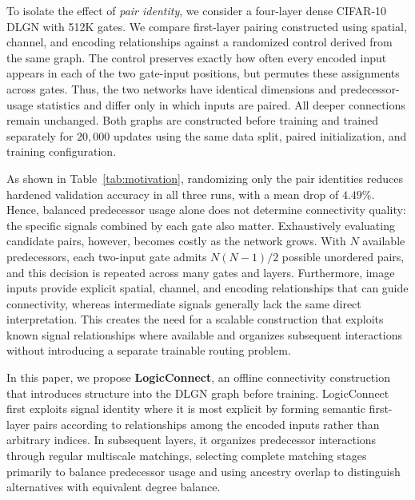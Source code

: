 To isolate the effect of \emph{pair identity}, we consider a four-layer
dense CIFAR-10 DLGN with 512K gates.
We compare first-layer pairing constructed using spatial, channel, and encoding relationships against a randomized control derived from the same graph.
The control
preserves exactly how often every encoded input appears in each of the two
gate-input positions, but permutes these assignments across gates. Thus, the
two networks have identical dimensions and predecessor-usage statistics and
differ only in which inputs are paired.
All deeper connections remain unchanged. Both graphs are constructed before training and trained separately for $20,000$ updates using the same data split, paired initialization, and training configuration.

As shown in Table~\ref{tab:motivation}, randomizing only the pair identities
reduces hardened validation accuracy in all three runs, with a mean drop of
$4.49\%$. Hence, balanced predecessor usage alone does not
determine connectivity quality: the specific signals combined by each gate
also matter. 
Exhaustively evaluating candidate pairs, however, becomes costly as the network grows. With $N$ available predecessors, each two-input gate admits
$N(N-1)/2$ possible unordered pairs, and this decision is repeated across
many gates and layers. Furthermore, image inputs provide explicit spatial,
channel, and encoding relationships that can guide connectivity, whereas
intermediate signals generally lack the same direct interpretation. This
creates the need for a scalable construction that exploits known signal
relationships where available and organizes subsequent interactions without
introducing a separate trainable routing problem.

In this paper, we propose \textbf{LogicConnect}, an offline connectivity
construction that introduces structure into the DLGN graph before training.
LogicConnect first exploits signal identity where it is most explicit by
forming semantic first-layer pairs according to relationships among the
encoded inputs rather than arbitrary indices. In subsequent layers, it
organizes predecessor interactions through regular multiscale matchings,
selecting complete matching stages primarily to balance predecessor usage
and using ancestry overlap to distinguish alternatives with equivalent
degree balance. 


